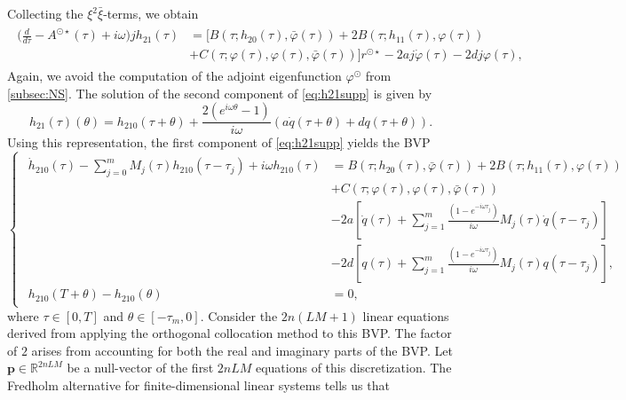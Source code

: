 \documentclass[english]{myarticle}
\begin{document}
\begin{sloppypar}
Collecting the $\xi^2 \bar{\xi}$-terms, we obtain
\begin{align}
\begin{split} \label{eq:h21supp}
    \bigg(\frac{d}{d \tau} - A^{\odot \star}(\tau) + {i \omega} \bigg)j h_{21}(\tau)  &= [B(\tau;h_{20}(\tau),\bar{\varphi}(\tau)) + 2B(\tau;h_{11}(\tau),\varphi(\tau)) \\
    & + C(\tau;\varphi(\tau),\varphi(\tau),\bar{\varphi}(\tau))]r^{\odot \star} - 2 a j\dot{\varphi}(\tau) -2d j\varphi(\tau),
\end{split}
\end{align}
Again, we avoid the computation of the adjoint eigenfunction $\varphi^\odot$ from \cref{subsec:NS}. The solution of the second component of \eqref{eq:h21supp} is given by
\begin{equation*}
    h_{21}(\tau)(\theta) = h_{210}(\tau+\theta) + \frac{2(e^{i \omega \theta} - 1)}{i \omega} (a \dot{q}(\tau+\theta) + d q(\tau+\theta)).
\end{equation*}
Using this representation, the first component of \eqref{eq:h21supp} yields the BVP
\begin{equation*}
    \begin{cases}
    \begin{aligned}
        \dot{h}_{210}(\tau) - \textstyle\sum_{j=0}^{m} M_j(\tau) h_{210}(\tau-\tau_j) + i \omega h_{210}(\tau) &= B(\tau;h_{20}(\tau),\bar{\varphi}(\tau)) 
        + 2B(\tau;h_{11}(\tau),\varphi(\tau)) \\
        &+C(\tau;\varphi(\tau),\varphi(\tau),\bar{\varphi}(\tau)) \\
        & -2a[\dot{q}(\tau) + \textstyle\sum_{j=1}^m \frac{(1-e^{-i\omega \tau_j})}{i \omega} M_j(\tau) \dot{q}(\tau-\tau_j)] \\
        &-2d[q(\tau) + \textstyle\sum_{j=1}^m \frac{(1-e^{-i\omega \tau_j})}{i \omega} M_j(\tau) q(\tau-\tau_j)], \\
        h_{210}(T + \theta) - h_{210}(\theta) &= 0,
    \end{aligned}
    \end{cases}
\end{equation*}
where $\tau \in [0,T]$ and $\theta \in [-\tau_m,0]$. Consider the $2n(LM+1)$ linear equations derived from applying the orthogonal collocation method to this BVP. The factor of $2$ arises from accounting for both the real and imaginary parts of the BVP. Let $\mathbf{p} \in \mathbb{R}^{2nLM}$ be a null-vector of the first $2nLM$ equations of this discretization. The Fredholm alternative for finite-dimensional linear systems tells us that

\end{sloppypar}
\end{document}
